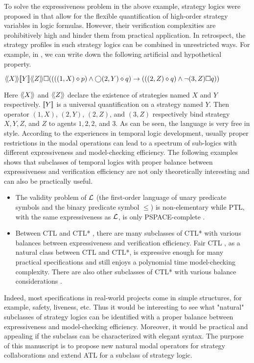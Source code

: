 To solve the expressiveness problem in the above example, strategy logics were proposed in \cite{CLM10,CHP10,MMV10} that allow for the flexible quantification of high-order strategy variables in logic formulas.  
However, their verification complexities are prohibitively high and hinder them from practical application.  
In retrospect, the strategy profiles in such strategy logics can be combined in unrestricted ways.  
For example, in \cite{MMV10}, we can write down the following artificial and hypothetical property.  
\begin{center} 
$\langle\!\langle X\rangle\!\rangle [\![ Y]\!]\langle\!\langle Z\rangle\!\rangle 
\square ((((1,X)\diamond p) \wedge \bigcirc (2,Y) \diamond q)\rightarrow
(((2,Z)\diamond q)\wedge\neg(3,Z)\square q))$
\end{center} 
Here $\langle\!\langle X\rangle\!\rangle$ and $\langle\!\langle Z\rangle\!\rangle$ declare the existence of strategies named $X$ and $Y$ respectively.  
$[\![ Y]\!]$ is a universal quantification on a strategy named $Y$.  
Then operator $(1,X)$, $(2,Y)$, $(2,Z)$, and $(3,Z)$ 
respectively bind strategy $X, Y, Z$, and $Z$ to agents $1, 2, 2$, and $3$.  
As can be seen, the language is very free in style.  
According to the experiences in temporal logic development, 
usually proper restrictions in the modal operations can lead to 
a spectrum of sub-logics with different expressiveness and model-checking efficiency.  
The following examples shows that subclasses of temporal logics with proper balance between expressiveness and verification efficiency are not only theoretically interesting and can also be practically useful.
\begin{itemize} 
\item The validity problem of $\cal L$ (the first-order language of 
  unary predicate symbols and the binary predicate symbol $\leq$) 
  is non-elementary \cite{Stockmeyer74} while 
  PTL, with the same expressiveness as $\cal L$, is only PSPACE-complete \cite{SC85}.  
\item Between CTL \cite{CES86} and CTL* \cite{EH85,EH86}, there are many subclasses of CTL* with various balances 
  between expressiveness and verification efficiency.  
  Fair CTL \cite{EL87}, as a natural class between CTL and CTL*, 
  is expressive enough for many practical specifications and 
  still enjoys a polynomial time model-checking complexity.  
  There are also other subclasses of CTL* with various balance considerations \cite{BPM83,EC80,EH86,Lamport80}.  
\end{itemize} 

Indeed, most specifications in real-world projects come in simple structures, for example, safety, liveness, etc. 
Thus it would be interesting to see what "natural" subclasses of strategy logics 
can be identified with a proper balance between expressiveness and model-checking efficiency.  
Moreover, it would be practical and appealing if the subclass can be characterized with elegant syntax.  
The purpose of this manuscript is to propose new natural modal operators for strategy collaborations and extend ATL for a subclass of strategy logic.  


